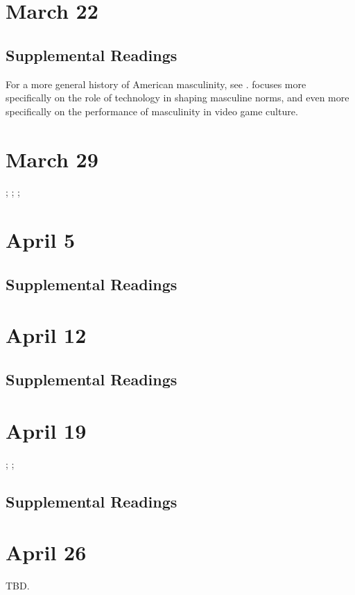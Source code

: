 \documentclass[11pt]{article}
\begin{document}
\section{March 22}
\label{sec:orgfbd6b72}


\subsection{Supplemental Readings}
\label{sec:org719874e}

For a more general history of American masculinity, see \cite{Rotundo:1994ts}. \cite{Mellstrom:2004ur} focuses more specifically on the role of technology in shaping masculine norms, and \cite{Burrill2008} even more specifically on the performance of masculinity in video game culture.

\section{March 29}
\label{sec:orgaec800e}

; ; ; 

\section{April 5}
\label{sec:org220c962}


\subsection{Supplemental Readings}
\label{sec:org4079b1b}

\cite{Burrill2008}

\section{April 12}
\label{sec:orge00144e}


\subsection{Supplemental Readings}
\label{sec:orgb329030}

\cite{Shaw:2015dr}

\section{April 19}
\label{sec:orga889f99}

; ; 

\subsection{Supplemental Readings}
\label{sec:org725b302}

\cite{Ruberg:2017ww}

\section{April 26}
\label{sec:org1907822}

TBD.

\newpage

\nocite{*} 
\printbibliography
\end{document}
